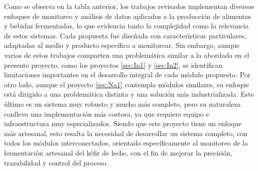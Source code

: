 Como se observa en la tabla anterior, los trabajos revisados implementan diversos
enfoques de monitoreo y análisis de datos aplicados a la producción de alimentos 
y bebidas fermentadas, lo que evidencia tanto la complejidad como la relevancia 
de estos sistemas. Cada propuesta fue diseñada con características particulares, 
adaptadas al medio y producto específico a monitorear.
\newline
Sin embargo, aunque varios de estos trabajos comparten una problemática similar 
a la abordada en el presente proyecto, como los proyectos \ref{sec:In1} y
\ref{sec:In2}, se identifican limitaciones importantes en el desarrollo 
integral de cada módulo propuesto. Por otro lado, aunque el proyecto \ref{sec:Na1} 
contempla módulos similares, su enfoque está dirigido a una problemática distinta y 
una solución más industrializada. Este último es un sistema muy robusto y mucho más 
completo, pero su naturaleza conlleva una implementación más costosa, ya que requiere
equipo e infraestructura muy especializados.
\newline
Siendo que este proyecto tiene un enfoque más artesanal, esto resalta la necesidad 
de desarrollar un sistema completo, con todos los módulos interconectados, orientado 
específicamente al monitoreo de la fermentación artesanal del kéfir de leche, con el 
fin de mejorar la precisión, trazabilidad y control del proceso.